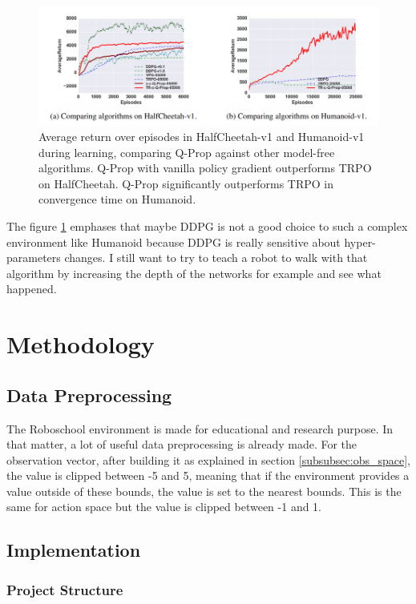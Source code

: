 \documentclass{article}
\begin{document}
\begin{figure}[ht]
  \centering
  \includegraphics[width=.8\textwidth]{benchmark}
  \caption{Average return over episodes in HalfCheetah-v1 and Humanoid-v1 during
    learning, comparing Q-Prop against other model-free algorithms. Q-Prop with
    vanilla policy gradient outperforms TRPO on HalfCheetah. Q-Prop
    significantly outperforms TRPO in convergence time on Humanoid.}
  \label{fig:benchmark}
\end{figure}

The figure \ref{fig:benchmark} emphases that maybe DDPG is not a good choice to
such a complex environment like Humanoid because DDPG is really sensitive about
hyper-parameters changes. I still want to try to teach a robot to walk with that
algorithm by increasing the depth of the networks for example and see what
happened.  

\newpage
\section{Methodology}

\subsection{Data Preprocessing}

The Roboschool environment is made for educational and research purpose. In that
matter, a lot of useful data preprocessing is already made. For the observation
vector, after building it as explained in section \ref{subsubsec:obs_space}, the
value is clipped between -5 and 5, meaning that if the environment provides a
value outside of these bounds, the value is set to the nearest bounds. This is
the same for action space but the value is clipped between -1 and 1. 

\subsection{Implementation}

\subsubsection{Project Structure}
\end{document}
